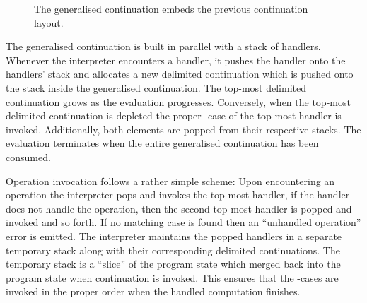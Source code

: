 \begin{figure}[H]
\begin{center}
\caption{The generalised continuation embeds the previous continuation layout.}\label{fig:continuation-notion}
\end{center}
\end{figure}

The generalised continuation is built in parallel with a stack of handlers. Whenever the interpreter encounters a handler, it pushes the handler onto the handlers' stack and allocates a new delimited continuation which is pushed onto the stack inside the generalised continuation. The top-most delimited continuation grows as the evaluation progresses. Conversely, when the top-most delimited continuation is depleted the proper -case of the top-most handler is invoked. Additionally, both elements are popped from their respective stacks. The evaluation terminates when the entire generalised continuation has been consumed.

Operation invocation follows a rather simple scheme: Upon encountering an operation the interpreter pops and invokes the top-most handler, if the handler does not handle the operation, then the second top-most handler is popped and invoked and so forth. If no matching case is found then an ``unhandled operation'' error is emitted. The interpreter maintains the popped handlers in a separate temporary stack along with their corresponding delimited continuations. The temporary stack is a ``slice'' of the program state which merged back into the program state when continuation is invoked. This ensures that the -cases are invoked in the proper order when the handled computation finishes. 
